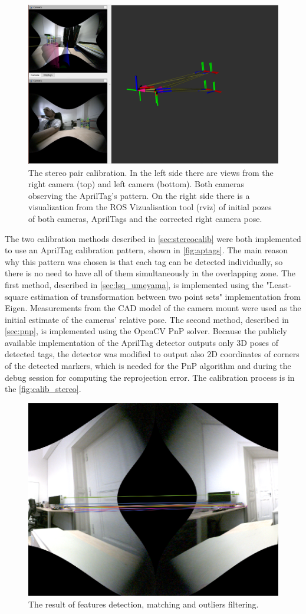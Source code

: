 \begin{figure}[h]
    \centering
    \includegraphics[width=.8\textwidth]{graphics/calib_process.png}
    \caption[The stereocamera calibration process]{The stereo pair calibration. In the left side there are views from the right camera (top) and left camera (bottom). Both cameras observing the AprilTag's pattern. On the right side there is a visualization from the ROS Vizualisation tool (rviz) of initial pozes of both cameras, AprilTags and the corrected right camera pose.}
    \label{fig:calib_stereo}
\end{figure}

The two calibration methods described in \autoref{sec:stereocalib} were both implemented to use an AprilTag calibration pattern, shown in \autoref{fig:aptags}.
The main reason why this pattern was chosen is that each tag can be detected individually, so there is no need to have all of them simultaneously in the overlapping zone.
The first method, described in \autoref{sec:lsq_umeyama}, is implemented using the "Least-square estimation of transformation between two point sets" \cite{Umeyama1991} implementation from Eigen.
Measurements from the CAD model of the camera mount were used as the initial estimate of the cameras' relative pose.
The second method, described in \autoref{sec:pnp}, is implemented using the OpenCV PnP solver.
Because the publicly available implementation of the AprilTag detector outputs only 3D poses of detected tags, the detector was modified to output also 2D coordinates of corners of the detected markers, which is needed for the PnP algorithm and during the debug session for computing the reprojection error.
The calibration process is in the \autoref{fig:calib_stereo}.

\begin{figure}[h]
    \centering
    \includegraphics[width=.5\textwidth]{graphics/corresp.png}
    \caption{The result of features detection, matching and outliers filtering.}
    \label{fig:corresp_life}
\end{figure}

